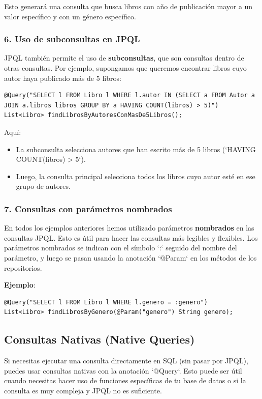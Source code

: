 \documentclass[11pt]{article}
\begin{document}
Esto generará una consulta que busca libros con año de publicación mayor a un valor específico y con un género específico.

\subsubsection{6. Uso de subconsultas en JPQL}
\label{sec:org7823dde}
JPQL también permite el uso de \textbf{\textbf{subconsultas}}, que son consultas dentro de otras consultas. Por ejemplo, supongamos que queremos encontrar libros cuyo autor haya publicado más de 5 libros:

\begin{verbatim}
@Query("SELECT l FROM Libro l WHERE l.autor IN (SELECT a FROM Autor a JOIN a.libros libros GROUP BY a HAVING COUNT(libros) > 5)")
List<Libro> findLibrosByAutoresConMasDe5Libros();
\end{verbatim}

Aquí:
\begin{itemize}
\item La subconsulta selecciona autores que han escrito más de 5 libros (`HAVING COUNT(libros) > 5`).
\item Luego, la consulta principal selecciona todos los libros cuyo autor esté en ese grupo de autores.
\end{itemize}

\subsubsection{7. Consultas con parámetros nombrados}
\label{sec:org9da1de9}
En todos los ejemplos anteriores hemos utilizado parámetros \textbf{\textbf{nombrados}} en las consultas JPQL. Esto es útil para hacer las consultas más legibles y flexibles. Los parámetros nombrados se indican con el símbolo `:` seguido del nombre del parámetro, y luego se pasan usando la anotación `@Param` en los métodos de los repositorios.

\textbf{\textbf{Ejemplo}}:

\begin{verbatim}
@Query("SELECT l FROM Libro l WHERE l.genero = :genero")
List<Libro> findLibrosByGenero(@Param("genero") String genero);
\end{verbatim}

\subsection{Consultas Nativas (Native Queries)}
\label{sec:org1550154}
Si necesitas ejecutar una consulta directamente en SQL (sin pasar por JPQL), puedes usar consultas nativas con la anotación `@Query`. Esto puede ser útil cuando necesitas hacer uso de funciones específicas de tu base de datos o si la consulta es muy compleja y JPQL no es suficiente.
\end{document}
